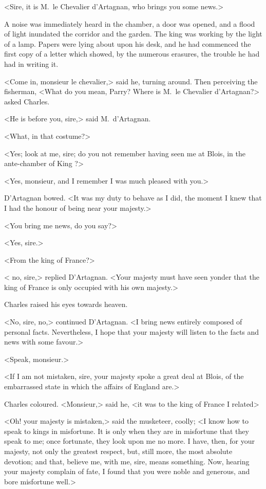 <Sire, it is M.~le Chevalier d'Artagnan, who brings you some news.>

A noise was immediately heard in the chamber, a door was opened, and a flood of light inundated the corridor and the garden. The king was working by the light of a lamp. Papers were lying about upon his desk, and he had commenced the first copy of a letter which showed, by the numerous erasures, the trouble he had had in writing it.

<Come in, monsieur le chevalier,> said he, turning around. Then perceiving the fisherman, <What do you mean, Parry? Where is M.~le Chevalier d'Artagnan?> asked Charles.

<He is before you, sire,> said M.~d'Artagnan.

<What, in that costume?>

<Yes; look at me, sire; do you not remember having seen me at Blois, in the ante-chamber of King ?>

<Yes, monsieur, and I remember I was much pleased with you.>

D'Artagnan bowed. <It was my duty to behave as I did, the moment I knew that I had the honour of being near your majesty.>

<You bring me news, do you say?>

<Yes, sire.>

<From the king of France?>

< no, sire,> replied D'Artagnan. <Your majesty must have seen yonder that the king of France is only occupied with his own majesty.>

Charles raised his eyes towards heaven.

<No, sire, no,> continued D'Artagnan. <I bring news entirely composed of personal facts. Nevertheless, I hope that your majesty will listen to the facts and news with some favour.>

<Speak, monsieur.>

<If I am not mistaken, sire, your majesty spoke a great deal at Blois, of the embarrassed state in which the affairs of England are.>

Charles coloured. <Monsieur,> said he, <it was to the king of France I related\longdash>

<Oh! your majesty is mistaken,> said the musketeer, coolly; <I know how to speak to kings in misfortune. It is only when they are in misfortune that they speak to me; once fortunate, they look upon me no more. I have, then, for your majesty, not only the greatest respect, but, still more, the most absolute devotion; and that, believe me, with me, sire, means something. Now, hearing your majesty complain of fate, I found that you were noble and generous, and bore misfortune well.>

